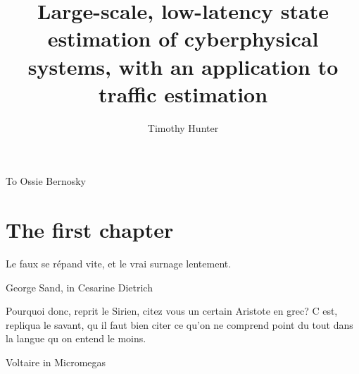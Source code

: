 \documentclass{ucbthesis}
\begin{document}

\title{Large-scale, low-latency state estimation of cyberphysical systems, with an application to traffic estimation}
\author{Timothy Hunter}




\maketitle
\approvalpage
\copyrightpage

% 

\begin{frontmatter}

\begin{dedication}
\null\vfil
\begin{center}
To Ossie Bernosky\\\vspace{12pt}
\end{center}
\vfil\null
\end{dedication}

\tableofcontents
\clearpage
\listoffigures
\clearpage
\listoftables

\begin{acknowledgements}

\end{acknowledgements}

\end{frontmatter}

\pagestyle{headings}



\chapter{The first chapter}
\epigraph{Le faux se répand vite, et le vrai surnage lentement.}{George Sand, in Cesarine Dietrich}



\epigraph{Pourquoi donc, reprit le Sirien, citez vous un certain Aristote en grec? 
C est, repliqua le savant, qu il faut bien citer ce qu'on ne comprend point du tout
 dans la langue qu on entend le moins.}{Voltaire in Micromegas}



\end{document}
